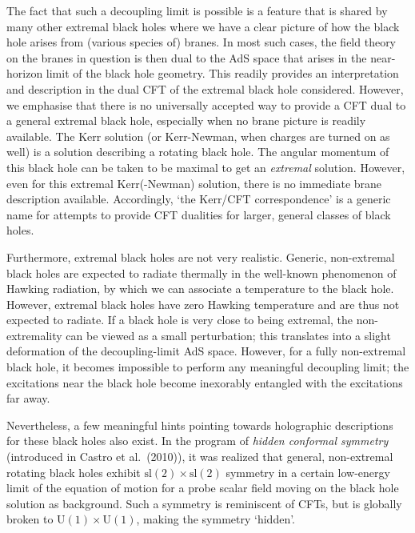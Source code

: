 \documentclass[12pt]{article}
\renewcommand{\^}[1]{\hat{#1}}
\begin{document}
The fact that such a decoupling limit is possible is a feature that is shared by many other extremal black holes where we have a clear picture of how the black hole arises from (various species of) branes. In most such cases, the field theory on the branes in question is then dual to the AdS space that arises in the near-horizon limit of the black hole geometry. This readily provides an interpretation and description in the dual CFT of the extremal black hole considered. However, we emphasise that there is no universally accepted way to provide a CFT dual to a general extremal black hole, especially when no brane picture is readily available. The Kerr solution (or Kerr-Newman, when charges are turned on as well) is a solution describing a rotating black hole. The angular momentum of this black hole can be taken to be maximal to get an \emph{extremal} solution. However, even for this extremal Kerr(-Newman) solution, there is no immediate brane description available.
 Accordingly, `the Kerr/CFT correspondence' is a generic name for attempts to provide CFT dualities for larger, general classes of black holes.

Furthermore, extremal black holes are not very realistic. Generic, non-extremal black holes are expected to radiate thermally in the well-known phenomenon of Hawking radiation, by which we can associate a temperature to the black hole. However, extremal black holes have zero Hawking temperature and are thus not expected to radiate. If a black hole is very close to being extremal, the non-extremality can be viewed as a small perturbation; this translates into a slight deformation of the decoupling-limit AdS space. However, for a fully non-extremal black hole, it becomes impossible to perform any meaningful decoupling limit; the excitations near the black hole become inexorably entangled with the excitations far away.

Nevertheless, a few meaningful hints pointing towards holographic descriptions for these black holes also exist. In the program of \emph{hidden conformal symmetry} (introduced in Castro et al.~(2010)), it was realized that general, non-extremal rotating black holes exhibit $\mbox{sl}(2)\times \mbox{sl}(2)$ symmetry in a certain low-energy limit of the equation of motion for a probe scalar field moving on the black hole solution as background. Such a symmetry is reminiscent of CFTs, but is globally broken to $\mbox{U}(1)\times \mbox{U}(1)$, making the symmetry `hidden'.
\end{document}
